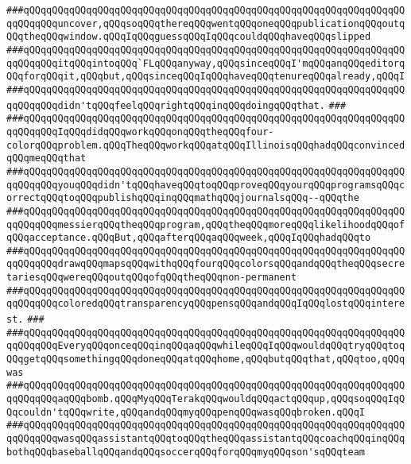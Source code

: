 \verb|###qQQqqQQqqQQqqQQqqQQqqQQqqQQqqQQqqQQqqQQqqQQqqQQqqQQqqQQqqQQqqQQqqQQqqQQqqQQquncover,qQQqsoqQQqthereqQQqwentqQQqoneqQQqpublicationqQQqoutqQQqtheqQQqwindow.qQQqIqQQqguessqQQqIqQQqcouldqQQqhaveqQQqslipped|\newline
\verb|###qQQqqQQqqQQqqQQqqQQqqQQqqQQqqQQqqQQqqQQqqQQqqQQqqQQqqQQqqQQqqQQqqQQqqQQqqQQqitqQQqintoqQQq`FLqQQqanyway,qQQqsinceqQQqI'mqQQqanqQQqeditorqQQqforqQQqit,qQQqbut,qQQqsinceqQQqIqQQqhaveqQQqtenureqQQqalready,qQQqI|\newline
\verb|###qQQqqQQqqQQqqQQqqQQqqQQqqQQqqQQqqQQqqQQqqQQqqQQqqQQqqQQqqQQqqQQqqQQqqQQqqQQqdidn'tqQQqfeelqQQqrightqQQqinqQQqdoingqQQqthat.|\newline
\verb|###|\newline
\verb|###qQQqqQQqqQQqqQQqqQQqqQQqqQQqqQQqqQQqqQQqqQQqqQQqqQQqqQQqqQQqqQQqqQQqqQQqqQQqIqQQqdidqQQqworkqQQqonqQQqtheqQQqfour-colorqQQqproblem.qQQqTheqQQqworkqQQqatqQQqIllinoisqQQqhadqQQqconvincedqQQqmeqQQqthat|\newline
\verb|###qQQqqQQqqQQqqQQqqQQqqQQqqQQqqQQqqQQqqQQqqQQqqQQqqQQqqQQqqQQqqQQqqQQqqQQqqQQqyouqQQqdidn'tqQQqhaveqQQqtoqQQqproveqQQqyourqQQqprogramsqQQqcorrectqQQqtoqQQqpublishqQQqinqQQqmathqQQqjournalsqQQq--qQQqthe|\newline
\verb|###qQQqqQQqqQQqqQQqqQQqqQQqqQQqqQQqqQQqqQQqqQQqqQQqqQQqqQQqqQQqqQQqqQQqqQQqqQQqmessierqQQqtheqQQqprogram,qQQqtheqQQqmoreqQQqlikelihoodqQQqofqQQqacceptance.qQQqBut,qQQqafterqQQqaqQQqweek,qQQqIqQQqhadqQQqto|\newline
\verb|###qQQqqQQqqQQqqQQqqQQqqQQqqQQqqQQqqQQqqQQqqQQqqQQqqQQqqQQqqQQqqQQqqQQqqQQqqQQqdrawqQQqmapsqQQqwithqQQqfourqQQqcolorsqQQqandqQQqtheqQQqsecretariesqQQqwereqQQqoutqQQqofqQQqtheqQQqnon-permanent|\newline
\verb|###qQQqqQQqqQQqqQQqqQQqqQQqqQQqqQQqqQQqqQQqqQQqqQQqqQQqqQQqqQQqqQQqqQQqqQQqqQQqcoloredqQQqtransparencyqQQqpensqQQqandqQQqIqQQqlostqQQqinterest.|\newline
\verb|###|\newline
\verb|###qQQqqQQqqQQqqQQqqQQqqQQqqQQqqQQqqQQqqQQqqQQqqQQqqQQqqQQqqQQqqQQqqQQqqQQqqQQqEveryqQQqonceqQQqinqQQqaqQQqwhileqQQqIqQQqwouldqQQqtryqQQqtoqQQqgetqQQqsomethingqQQqdoneqQQqatqQQqhome,qQQqbutqQQqthat,qQQqtoo,qQQqwas|\newline
\verb|###qQQqqQQqqQQqqQQqqQQqqQQqqQQqqQQqqQQqqQQqqQQqqQQqqQQqqQQqqQQqqQQqqQQqqQQqqQQqaqQQqbomb.qQQqMyqQQqTerakqQQqwouldqQQqactqQQqup,qQQqsoqQQqIqQQqcouldn'tqQQqwrite,qQQqandqQQqmyqQQqpenqQQqwasqQQqbroken.qQQqI|\newline
\verb|###qQQqqQQqqQQqqQQqqQQqqQQqqQQqqQQqqQQqqQQqqQQqqQQqqQQqqQQqqQQqqQQqqQQqqQQqqQQqwasqQQqassistantqQQqtoqQQqtheqQQqassistantqQQqcoachqQQqinqQQqbothqQQqbaseballqQQqandqQQqsoccerqQQqforqQQqmyqQQqson'sqQQqteam|\newline
